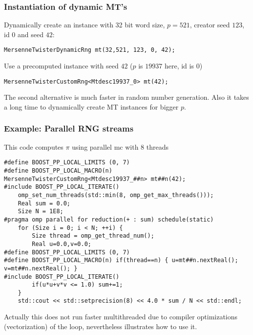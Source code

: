 \documentclass{beamer}
\begin{document}
\begin{frame}[fragile]
\frametitle{Instantiation of dynamic MT's}
Dynamically create an instance with 32 bit word size, $p=521$, creator seed $123$, id $0$ and seed $42$:
\vspace{2mm}
\begin{verbatim}
MersenneTwisterDynamicRng mt(32,521, 123, 0, 42);
\end{verbatim}

Use a precomputed instance with seed $42$ ($p$ is $19937$ here, id is $0$)
\vspace{2mm}
\begin{verbatim}
MersenneTwisterCustomRng<Mtdesc19937_0> mt(42);
\end{verbatim}

The second alternative is much faster in random number generation. Also it takes a long time to dynamically create MT instances for bigger $p$.
\end{frame}


\begin{frame}[fragile]
\frametitle{Example: Parallel RNG streams}
This code computes $\pi$ using parallel mc with $8$ threads
\vspace{2mm}
\begin{verbatim}
#define BOOST_PP_LOCAL_LIMITS (0, 7)
#define BOOST_PP_LOCAL_MACRO(n) MersenneTwisterCustomRng<Mtdesc19937_##n> mt##n(42);
#include BOOST_PP_LOCAL_ITERATE()
    omp_set_num_threads(std::min(8, omp_get_max_threads()));
    Real sum = 0.0;
    Size N = 1E8;
#pragma omp parallel for reduction(+ : sum) schedule(static)
    for (Size i = 0; i < N; ++i) {
        Size thread = omp_get_thread_num();
        Real u=0.0,v=0.0;
#define BOOST_PP_LOCAL_LIMITS (0, 7)
#define BOOST_PP_LOCAL_MACRO(n) if(thread==n) { u=mt##n.nextReal(); v=mt##n.nextReal(); }
#include BOOST_PP_LOCAL_ITERATE()
        if(u*u+v*v <= 1.0) sum+=1;
    }
    std::cout << std::setprecision(8) << 4.0 * sum / N << std::endl;
\end{verbatim}

Actually this does not run faster multithreaded due to compiler optimizations (vectorization) of the loop, nevertheless illustrates how to use it.
\end{frame}

\end{document}

